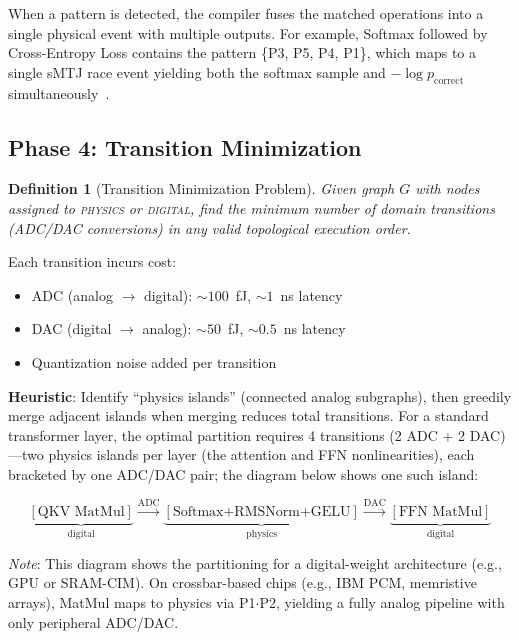 \documentclass[11pt]{article}
\newtheorem{definition}{Definition}
\begin{document}
When a pattern is detected, the compiler fuses the matched operations into a single physical event with multiple outputs. For example, Softmax followed by Cross-Entropy Loss contains the pattern \{P3, P5, P4, P1\}, which maps to a single sMTJ race event yielding both the softmax sample and $-\log p_{\text{correct}}$ simultaneously~\cite{bieg2026}.

\subsection{Phase 4: Transition Minimization}

\begin{definition}[Transition Minimization Problem]
Given graph $G$ with nodes assigned to \textsc{physics} or \textsc{digital}, find the minimum number of domain transitions (ADC/DAC conversions) in any valid topological execution order.
\end{definition}

Each transition incurs cost:
\begin{itemize}[leftmargin=*]
\item ADC (analog $\to$ digital): ${\sim}100$~fJ, ${\sim}1$~ns latency
\item DAC (digital $\to$ analog): ${\sim}50$~fJ, ${\sim}0.5$~ns latency
\item Quantization noise added per transition
\end{itemize}

\textbf{Heuristic}: Identify ``physics islands'' (connected analog subgraphs), then greedily merge adjacent islands when merging reduces total transitions. For a standard transformer layer, the optimal partition requires 4 transitions (2 ADC + 2 DAC)---two physics islands per layer (the attention and FFN nonlinearities), each bracketed by one ADC/DAC pair; the diagram below shows one such island:

\begin{equation*}
\underbrace{[\text{QKV MatMul}]}_{\text{digital}} \!\xrightarrow{\text{ADC}}\! \underbrace{[\text{Softmax+RMSNorm+GELU}]}_{\text{physics}} \!\xrightarrow{\text{DAC}}\! \underbrace{[\text{FFN MatMul}]}_{\text{digital}}
\end{equation*}

\noindent\textit{Note}: This diagram shows the partitioning for a digital-weight architecture (e.g., GPU or SRAM-CIM). On crossbar-based chips (e.g., IBM PCM, memristive arrays), MatMul maps to physics via P1$\cdot$P2, yielding a fully analog pipeline with only peripheral ADC/DAC.
\end{document}
